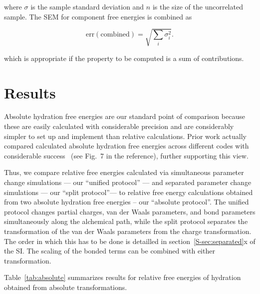 \documentclass[journal=jctcce,manuscript=article]{achemso}
\begin{document}
where $\sigma$ is the sample standard deviation and $n$ is the size of
the uncorrelated sample.  The SEM for component free energies is combined as

\begin{equation}
  \label{eq:sem-comb}
  \mathrm{err}(\mathrm{combined}) = \sqrt{\sum_i \sigma_i^2}.
\end{equation}

which is appropriate if the property to be computed is a sum of
contributions.


\section{Results}
\label{sec:results}



Absolute hydration free energies are our standard point of comparison 
because these are easily calculated with considerable precision
\cite{doi:10.1021/acs.jced.7b00104} %
and are considerably simpler to set up and implement than relative calculations.
Prior work actually compared calculated absolute hydration free energies across 
different codes with considerable success~\cite{klimovich_predicting_2010} (see 
Fig.~7 in the reference), further supporting this view.

Thus, we compare relative free energies calculated via simultaneous parameter 
change simulations --- our ``unified protocol'' --- and separated parameter 
change simulations --- our ``split protocol''--- to relative free energy 
calculations obtained from two absolute hydration free energies -- our 
``absolute protocol''.
The unified protocol changes partial charges, van der Waals parameters, and 
bond parameters simultaneously along the alchemical path, while the split 
protocol separates the transformation of the van der Waals parameters from the 
charge transformation.  The order in which this has to be done is detailled 
in section~\ref{S-sec:separated}x of the SI.  The scaling of the bonded terms 
can be combined with either transformation.

Table~\ref{tab:absolute} summarizes results for relative free energies of 
hydration obtained from absolute transformations.
\end{document}

